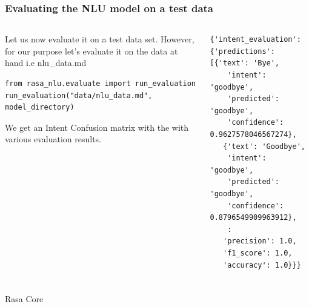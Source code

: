  \begin{frame}[fragile]\frametitle{Evaluating the NLU model on a test data}
 
    \begin{columns}
    \begin{column}[t]{0.5\linewidth}
Let us now evaluate it on a test data set. However, for our purpose let’s evaluate it on the data at hand i.e nlu\_data.md
\begin{lstlisting}
from rasa_nlu.evaluate import run_evaluation
run_evaluation("data/nlu_data.md", model_directory)
\end{lstlisting}

We get an Intent Confusion matrix with the with various evaluation results.
    \end{column}
    \begin{column}[t]{0.5\linewidth}
\begin{lstlisting}
{'intent_evaluation': {'predictions': [{'text': 'Bye',
    'intent': 'goodbye',
    'predicted': 'goodbye',
    'confidence': 0.9627578046567274},
   {'text': 'Goodbye',
    'intent': 'goodbye',
    'predicted': 'goodbye',
    'confidence': 0.8796549909963912},
	:
   'precision': 1.0,
   'f1_score': 1.0,
   'accuracy': 1.0}}}
\end{lstlisting}
    \end{column}
  \end{columns}
\end{frame}

 \begin{frame}[fragile]\frametitle{}
 \begin{center}
{\Large Rasa Core}
\end{center}
\end{frame}

